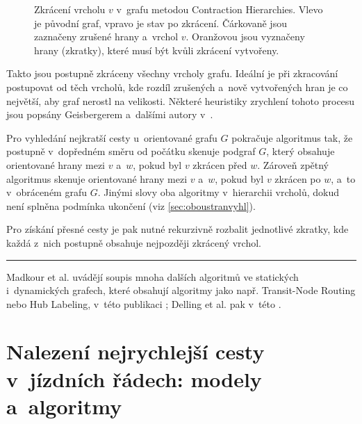 \begin{figure}[htbp]
	\centering
	\begin{subfigure}[b]{0.45\textwidth}
		\centering
		\contractionOne
        \label{contraction_1}
	\end{subfigure}
	\hfill
	\begin{subfigure}[b]{0.45\textwidth}
		\centering
		\contractionTwo
        \label{contraction_2}
	\end{subfigure}

	\caption[Zkrácení vrcholu v~grafu metodou Contraction Hierarchies.]{Zkrácení vrcholu \(v\) v~grafu metodou Contraction Hierarchies. Vlevo je původní graf, vpravo je stav po zkrácení. Čárkovaně jsou zaznačeny zrušené hrany a~vrchol \(v\). \textcolor{RedOrange}{Oranžovou} jsou vyznačeny hrany (zkratky), které musí být kvůli zkrácení vytvořeny.}
	\label{pic:contraction}
\end{figure}

Takto jsou postupně zkráceny všechny vrcholy grafu. Ideální je při zkracování postupovat od těch vrcholů, kde rozdíl zrušených a~nově vytvořených hran je co největší, aby graf nerostl na velikosti. Některé heuristiky zrychlení tohoto procesu jsou popsány Geisbergerem a~dalšími autory v~\cite{geisberger2008CHDiploma, geisberger2008CHFaster}.

Pro vyhledání nejkratší cesty u~orientované grafu \(G\) pokračuje algoritmus tak, že postupně v~dopředném směru od počátku skenuje podgraf \(G\), který obsahuje orientované hrany mezi $v$ a~$w$, pokud byl $v$ zkrácen před $w$. Zároveň zpětný algoritmus skenuje orientované hrany mezi $v$ a~$w$, pokud byl $v$ zkrácen po $w$, a~to v~obráceném grafu \(G\). Jinými slovy oba algoritmy  v~hierarchii vrcholů, dokud není splněna podmínka ukončení \cite{geisberger2008CHDiploma} (viz \autoref{sec:oboustranvyhl}).

Pro získání přesné cesty je pak nutné rekurzivně rozbalit jednotlivé zkratky, kde každá z~nich postupně obsahuje nejpozději zkrácený vrchol.

\noindent\rule[0.5ex]{\linewidth}{1pt}

Madkour et al. uvádějí soupis mnoha dalších algoritmů ve statických i~dynamických grafech, které obsahují algoritmy jako např. Transit-Node Routing nebo Hub Labeling, v~této publikaci \cite{madkour2017survey}; Delling et al. pak v~této \cite{Delling2009enginneringRoute}.

\chapter{Nalezení nejrychlejší cesty v~jízdních řádech: modely a~algoritmy}

